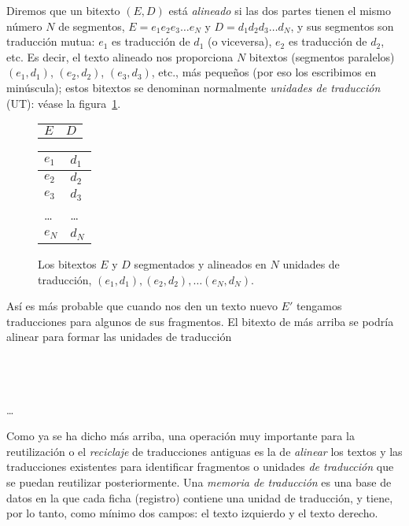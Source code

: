 Diremos que un bitexto $(E,D)$ está \emph{alineado} si las dos partes tienen el mismo número $N$ de segmentos, $E= e_1 e_2 e_3 \ldots e_N$ y $D= d_1 d_2 d_3 \ldots d_N$, y sus segmentos son traducción mutua: $e_1$ es traducción de $d_1$ (o viceversa), $e_2$ es traducción de $d_2$, etc. Es decir, el texto alineado nos proporciona $N$ bitextos (segmentos paralelos) $(e_1,d_1)$, $(e_2,d_2)$, $(e_3,d_3)$, etc., más pequeños (por eso los escribimos en minúscula); estos bitextos se denominan normalmente \emph{unidades de traducción} (UT): véase la figura~\ref{fg:alineat}. \begin{figure} \begin{center} \begin{tabular}{p{3cm}p{3cm}} $E$ &$D$ \end{tabular} \begin{tabular}{|p{3cm}|p{3cm}|} \hline

$e_1$ &$d_1$ \\\hline $e_2$ &$d_2$ \\\hline $e_3$ &$d_3$ \\\hline \ldots &\ldots \\\hline $e_N$ &$d_N$ \\\hline \end{tabular} \end{center} \caption{Los bitextos $E$ y $D$ segmentados y alineados en $N$ unidades de traducción, $(e_1,d_1), (e_2,d_2), \ldots (e_N,d_N)$.} \label{fg:alineat} \end{figure} 

Así es más probable que cuando nos den un texto nuevo $E'$ tengamos traducciones para algunos de sus fragmentos. El bitexto de más arriba se podría alinear para formar las unidades de traducción \begin{center} \\ \\ \\ \ldots\\  \end{center} 

Como ya se ha dicho más arriba, una operación muy importante para la reutilización o el \emph{reciclaje} de traducciones antiguas es la de \emph{alinear} los textos y las traducciones existentes para identificar fragmentos o unidades \emph{de traducción} que se puedan reutilizar posteriormente. Una \emph{memoria de traducción} es una base de datos en la que cada ficha (registro) contiene una unidad de traducción, y tiene, por lo tanto, como mínimo dos campos: el texto izquierdo y el texto derecho. 

